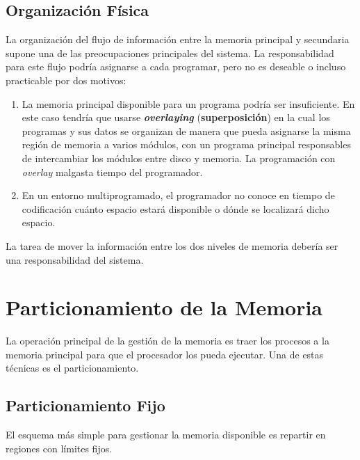 \documentclass[12pt,a4paper]{article}
\begin{document}
\subsection{Organización Física}
La organización del flujo de información entre la memoria principal y secundaria supone una de las preocupaciones principales del sistema. La responsabilidad para este flujo podría asignarse a cada programar, pero no es deseable o incluso practicable por dos motivos:
\begin{enumerate}
    \item La memoria principal disponible para un programa podría ser insuficiente. En este caso tendría que usarse \textbf{\textit{overlaying}} (\textbf{superposición}) en la cual los programas y sus datos se organizan de manera que pueda asignarse la misma región de memoria a varios módulos, con un programa principal responsables de intercambiar los módulos entre disco y memoria. La programación con \textit{overlay} malgasta tiempo del programador.
     \item En un entorno multiprogramado, el programador no conoce en tiempo de codificación cuánto espacio estará disponible o dónde se localizará dicho espacio.
\end{enumerate}
La tarea de mover la información entre los dos niveles de memoria debería ser una responsabilidad del sistema.

\section{Particionamiento de la Memoria}
La operación principal de la gestión de la memoria es traer los procesos a la memoria principal para que el procesador los pueda ejecutar. Una de estas técnicas es el particionamiento.
\subsection{Particionamiento Fijo}
El esquema más simple para gestionar la memoria disponible es repartir en regiones con límites fijos.
\end{document}
